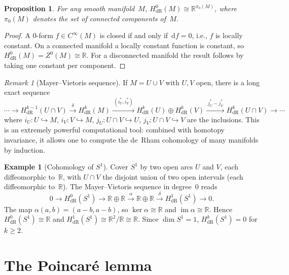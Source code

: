 \documentclass[12pt,a4paper,openany]{book}
\newtheorem{proposition}[theorem]{Proposition}
\theoremstyle{definition}
\newtheorem{example}[theorem]{Example}
\theoremstyle{remark}
\newtheorem{remark}[theorem]{Remark}
\newcommand{\R}{\mathbb{R}}
\DeclareMathOperator{\im}{im}
\newcommand{\dd}{\,\mathrm{d}}
\begin{document}
\begin{proposition}\label{prop:H0-components}
For any smooth manifold~$M$,
$H^0_{\mathrm{dR}}(M) \cong \R^{\pi_0(M)}$,
where $\pi_0(M)$ denotes the set of connected components of~$M$.
\end{proposition}

\begin{proof}
A $0$-form $f\in C^\infty(M)$ is closed if and only if $\dd f = 0$, i.e.,
$f$ is locally constant.  On a connected manifold a locally constant
function is constant, so $H^0_{\mathrm{dR}}(M) = Z^0(M)\cong\R$.
For a disconnected manifold the result follows by taking one constant
per component.
\end{proof}

\begin{remark}[Mayer--Vietoris sequence]\label{rem:mayer-vietoris}
If $M = U\cup V$ with $U,V$ open, there is a long exact sequence
\[
  \cdots \to H^{k-1}_{\mathrm{dR}}(U\cap V)
  \xrightarrow{\;\delta\;}
  H^k_{\mathrm{dR}}(M)
  \xrightarrow{\;(i_U^*,i_V^*)\;}
  H^k_{\mathrm{dR}}(U)\oplus H^k_{\mathrm{dR}}(V)
  \xrightarrow{\;j_U^*-j_V^*\;}
  H^k_{\mathrm{dR}}(U\cap V) \to \cdots
\]
where $i_U\colon U\hookrightarrow M$, $i_V\colon V\hookrightarrow M$,
$j_U\colon U\cap V\hookrightarrow U$, $j_V\colon U\cap V\hookrightarrow V$
are the inclusions.  This is an extremely powerful computational tool:
combined with homotopy invariance, it allows one to compute the
de~Rham cohomology of many manifolds by induction.
\end{remark}

\begin{example}[Cohomology of $S^1$]\label{ex:cohomology-S1}
Cover $S^1$ by two open arcs $U$ and $V$, each diffeomorphic to~$\R$,
with $U\cap V$ the disjoint union of two open intervals (each
diffeomorphic to~$\R$).  The Mayer--Vietoris sequence in degree~$0$ reads
\[
  0 \to H^0_{\mathrm{dR}}(S^1) \to \R\oplus\R
  \xrightarrow{\;\alpha\;} \R\oplus\R
  \xrightarrow{\;\delta\;} H^1_{\mathrm{dR}}(S^1) \to 0.
\]
The map $\alpha(a,b) = (a-b, a-b)$, so $\ker\alpha\cong\R$ and
$\im\alpha\cong\R$.  Hence $H^0_{\mathrm{dR}}(S^1)\cong\R$ and
$H^1_{\mathrm{dR}}(S^1)\cong\R^2/\R\cong\R$.  Since $\dim S^1 = 1$,
$H^k_{\mathrm{dR}}(S^1) = 0$ for $k\ge 2$.
\end{example}

\section{The Poincar\'e lemma}\label{sec:poincare-lemma}
\end{document}
